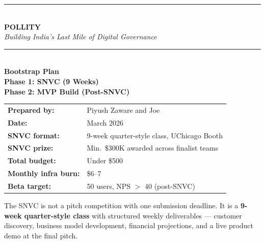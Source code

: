 \documentclass[12pt, a4paper]{article}
\begin{document}
\begin{titlepage}
    \centering
    \vspace*{1.5cm}

    {\color{pollityblue}\rule{\linewidth}{2pt}}\\[0.4cm]
    {\Huge\bfseries\color{pollityblue} POLLITY}\\[0.3cm]
    {\large\itshape Building India's Last Mile of Digital Governance}\\[0.2cm]
    {\color{pollityblue}\rule{\linewidth}{2pt}}\\[1.2cm]

    {\LARGE\bfseries Bootstrap Plan}\\[0.4cm]
    {\large\bfseries\color{snvcpurple} Phase 1: SNVC (9 Weeks)}\\[0.2cm]
    {\large\bfseries\color{buildblue} Phase 2: MVP Build (Post-SNVC)}\\[1.2cm]

    \begin{tabular}{ll}
        \textbf{Prepared by:}         & Piyush Zaware and Joe \\[0.3em]
        \textbf{Date:}                & March 2026 \\[0.3em]
        \textbf{SNVC format:}         & 9-week quarter-style class, UChicago Booth \\[0.3em]
        \textbf{SNVC prize:}          & Min.\ \$300K awarded across finalist teams \\[0.3em]
        \textbf{Total budget:}        & Under \$500 \\[0.3em]
        \textbf{Monthly infra burn:}  & \$6--7 \\[0.3em]
        \textbf{Beta target:}         & 50 users, NPS $>$ 40 (post-SNVC) \\
    \end{tabular}

    \vspace{1.2cm}

    \begin{tcolorbox}[
        colback=lightpurple,
        colframe=snvcpurple,
        boxrule=1.5pt,
        arc=4pt,
        title={\bfseries\color{snvcpurple} How SNVC Changes the Plan},
        fonttitle=\bfseries
    ]
    The SNVC is not a pitch competition with one submission deadline.
    It is a \textbf{9-week quarter-style class} with structured weekly deliverables ---
    customer discovery, business model development, financial projections,
    and a live product demo at the final pitch.


\end{tcolorbox}
\end{titlepage}
\end{document}
